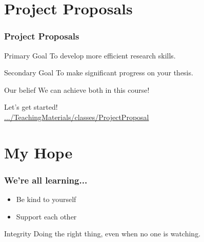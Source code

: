 \documentclass{beamer}
\begin{document}

\section{Project Proposals}


\begin{frame}
    \frametitle{Project Proposals}

    \begin{block}{Primary Goal}
        To develop more efficient research skills.
    \end{block}

    \begin{block}{Secondary Goal}
        To make significant progress on your thesis.
    \end{block}

    \begin{block}{Our belief}
        We can achieve both in this course!
    \end{block}

Let's get started!\\
        \href{https://github.com/analyticalworkflows/TeachingMaterials/tree/master/classes/ProjectProposal}{.../TeachingMaterials/classes/ProjectProposal}


\end{frame}


\section{My Hope}


\begin{frame}
    \frametitle{We're all learning...}



    \begin{itemize}
        \item Be kind to yourself
        \item Support each other
    \end{itemize}

	\bigskip

    \begin{block}{Integrity}
      Doing the right thing, even when no one is watching.
    \end{block}

\end{frame}
\end{document}
